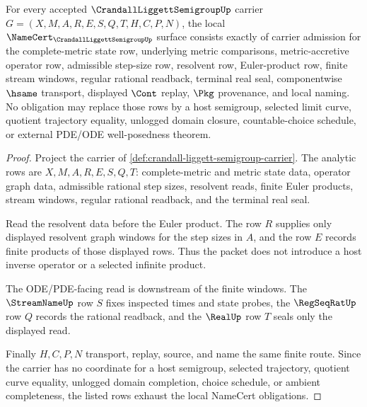 \begin{theorem}
\label{thm:crandall-liggett-semigroup-namecert-obligations}
For every accepted $\CrandallLiggettSemigroupUp$ carrier $G=(X,M,A,R,E,S,Q,T,H,C,P,N)$, the local $\NameCert_{\CrandallLiggettSemigroupUp}$ surface consists exactly of carrier admission for the complete-metric state row, underlying metric comparisons, metric-accretive operator row, admissible step-size row, resolvent row, Euler-product row, finite stream windows, regular rational readback, terminal real seal, componentwise $\hsame$ transport, displayed $\Cont$ replay, $\Pkg$ provenance, and local naming. No obligation may replace those rows by a host semigroup, selected limit curve, quotient trajectory equality, unlogged domain closure, countable-choice schedule, or external PDE/ODE well-posedness theorem.
\end{theorem}
\begin{proof}
Project the carrier of \autoref{def:crandall-liggett-semigroup-carrier}. The analytic rows are $X,M,A,R,E,S,Q,T$: complete-metric and metric state data, operator graph data, admissible rational step sizes, resolvent reads, finite Euler products, stream windows, regular rational readback, and the terminal real seal.

Read the resolvent data before the Euler product. The row $R$ supplies only displayed resolvent graph windows for the step sizes in $A$, and the row $E$ records finite products of those displayed rows. Thus the packet does not introduce a host inverse operator or a selected infinite product.

The ODE/PDE-facing read is downstream of the finite windows. The $\StreamNameUp$ row $S$ fixes inspected times and state probes, the $\RegSeqRatUp$ row $Q$ records the rational readback, and the $\RealUp$ row $T$ seals only the displayed read.

Finally $H,C,P,N$ transport, replay, source, and name the same finite route. Since the carrier has no coordinate for a host semigroup, selected trajectory, quotient curve equality, unlogged domain completion, choice schedule, or ambient completeness, the listed rows exhaust the local NameCert obligations.
\end{proof}

